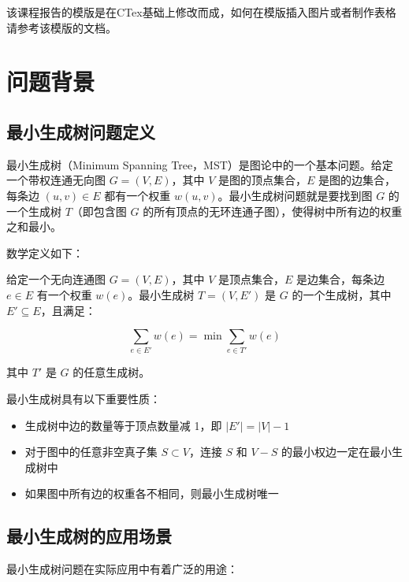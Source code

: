 \documentclass[a4paper,12pt]{ctexart}
\begin{document}
该课程报告的模版是在CTex\cite{ctex}基础上修改而成，如何在模版插入图片或者制作表格请参考该模版的文档。

\section{问题背景}
\subsection{最小生成树问题定义}
最小生成树（Minimum Spanning Tree，MST）是图论中的一个基本问题。给定一个带权连通无向图 $G=(V,E)$，其中 $V$ 是图的顶点集合，$E$ 是图的边集合，每条边 $(u,v)\in E$ 都有一个权重 $w(u,v)$。最小生成树问题就是要找到图 $G$ 的一个生成树 $T$（即包含图 $G$ 的所有顶点的无环连通子图），使得树中所有边的权重之和最小。

数学定义如下：

给定一个无向连通图 $G=(V,E)$，其中 $V$ 是顶点集合，$E$ 是边集合，每条边 $e \in E$ 有一个权重 $w(e)$。最小生成树 $T=(V, E')$ 是 $G$ 的一个生成树，其中 $E' \subseteq E$，且满足：

$$\sum_{e \in E'} w(e) = \min \sum_{e \in T'} w(e)$$

其中 $T'$ 是 $G$ 的任意生成树。

最小生成树具有以下重要性质：
\begin{itemize}
    \item 生成树中边的数量等于顶点数量减 1，即 $|E'| = |V| - 1$
    \item 对于图中的任意非空真子集 $S \subset V$，连接 $S$ 和 $V-S$ 的最小权边一定在最小生成树中
    \item 如果图中所有边的权重各不相同，则最小生成树唯一
\end{itemize}

\subsection{最小生成树的应用场景}
最小生成树问题在实际应用中有着广泛的用途：
\end{document}
